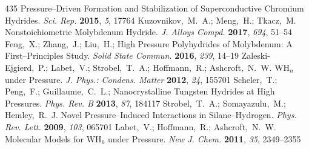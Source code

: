 \documentclass[12pt,letterpaper,oneside]{article}
\begin{document}
\begin{mcitethebibliography}{435}
  Pressure--Driven Formation and Stabilization of Superconductive Chromium
  Hydrides. \emph{Sci. Rep.} \textbf{2015}, \emph{5}, 17764\relax
\mciteBstWouldAddEndPuncttrue
\mciteSetBstMidEndSepPunct{\mcitedefaultmidpunct}
{\mcitedefaultendpunct}{\mcitedefaultseppunct}\relax
\EndOfBibitem
{}
Kuzovnikov,~M.~A.; Meng,~H.; Tkacz,~M. Nonstoichiometric Molybdenum Hydride.
  \emph{J. Alloys Compd.} \textbf{2017}, \emph{694}, 51--54\relax
\mciteBstWouldAddEndPuncttrue
\mciteSetBstMidEndSepPunct{\mcitedefaultmidpunct}
{\mcitedefaultendpunct}{\mcitedefaultseppunct}\relax
\EndOfBibitem
{}
Feng,~X.; Zhang,~J.; Liu,~H.;   High Pressure
  Polyhydrides of Molybdenum: A First--Principles Study. \emph{Solid State
  Commun.} \textbf{2016}, \emph{239}, 14--19\relax
\mciteBstWouldAddEndPuncttrue
\mciteSetBstMidEndSepPunct{\mcitedefaultmidpunct}
{\mcitedefaultendpunct}{\mcitedefaultseppunct}\relax
\EndOfBibitem
{}
Zaleski-Ejgierd,~P.; Labet,~V.; Strobel,~T.~A.; Hoffmann,~R.; Ashcroft,~N.~W.
  WH$_n$ under Pressure. \emph{J. Phys.: Condens. Matter} \textbf{2012},
  \emph{24}, 155701\relax
\mciteBstWouldAddEndPuncttrue
\mciteSetBstMidEndSepPunct{\mcitedefaultmidpunct}
{\mcitedefaultendpunct}{\mcitedefaultseppunct}\relax
\EndOfBibitem
{}
Scheler,~T.; Peng,~F.; Guillaume,~C.~L.; 
  Nanocrystalline Tungsten Hydrides at High Pressures. \emph{Phys. Rev. B}
  \textbf{2013}, \emph{87}, 184117\relax
\mciteBstWouldAddEndPuncttrue
\mciteSetBstMidEndSepPunct{\mcitedefaultmidpunct}
{\mcitedefaultendpunct}{\mcitedefaultseppunct}\relax
\EndOfBibitem
{}
Strobel,~T.~A.; Somayazulu,~M.; Hemley,~R.~J. Novel Pressure--Induced
  Interactions in Silane--Hydrogen. \emph{Phys. Rev. Lett.} \textbf{2009},
  \emph{103}, 065701\relax
\mciteBstWouldAddEndPuncttrue
\mciteSetBstMidEndSepPunct{\mcitedefaultmidpunct}
{\mcitedefaultendpunct}{\mcitedefaultseppunct}\relax
\EndOfBibitem
{}
Labet,~V.; Hoffmann,~R.; Ashcroft,~N.~W. Molecular Models for WH$_6$ under
  Pressure. \emph{New J. Chem.} \textbf{2011}, \emph{35}, 2349--2355\relax
\mciteBstWouldAddEndPuncttrue

\end{mcitethebibliography}
\end{document}
